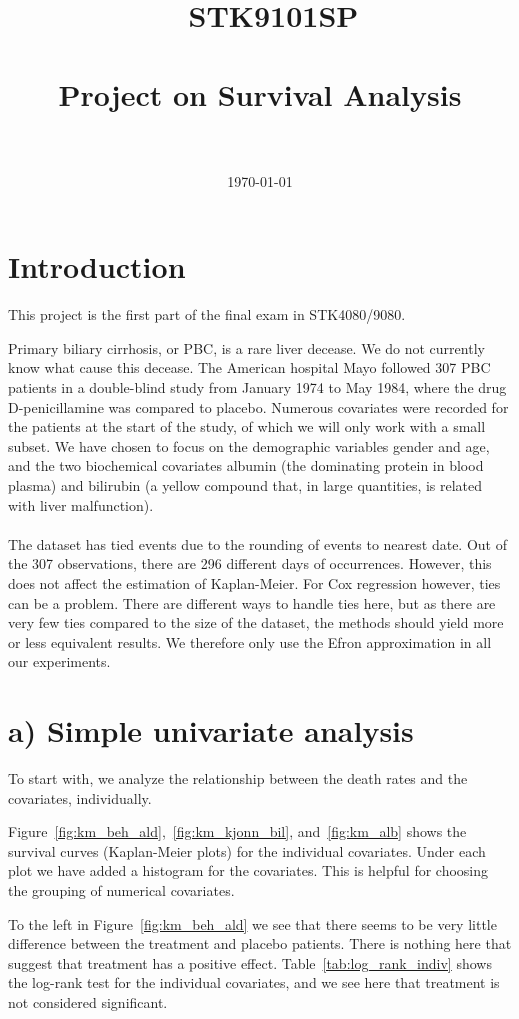 \documentclass[11pt,a4paper]{article}
\title{\
\normalfont \normalsize 
\textsc{STK9101SP} \\ [25pt] %
\horrule{0.5pt} \\[0.4cm] %
\huge Project on Survival Analysis \\ %
\horrule{2pt} \\[0.5cm] %
}
\author{\AuthorName} %
\date{\normalsize\today} %
\begin{document}
\maketitle
%
\section{Introduction}
This project is the first part of the final exam in STK4080/9080.

Primary biliary cirrhosis, or PBC, is a rare liver decease. We do not currently know what cause this decease.  
The American hospital Mayo followed 307 PBC patients in a double-blind study from January 1974 to May 1984, where the drug D-penicillamine was compared to placebo.
Numerous covariates were recorded for the patients at the start of the study, of which we will only work with a small subset.
We have chosen to focus on the demographic variables gender and age, and the two biochemical covariates albumin (the dominating protein in blood plasma) and bilirubin (a yellow compound that, in large quantities, is related with liver malfunction).
\\
\\
The dataset has tied events due to the rounding of events to nearest date. Out of the 307 observations, there are 296 different days of occurrences. However, this does not affect the estimation of Kaplan-Meier. 
For Cox regression however, ties can be a problem. There are different ways to handle ties here, but as there are very few ties compared to the size of the dataset, the methods should yield more or less equivalent results. We therefore only use the Efron approximation in all our experiments.


\section{a) Simple univariate analysis}

To start with, we analyze the relationship between the death rates and the covariates, individually.

Figure~\ref{fig:km_beh_ald},~\ref{fig:km_kjonn_bil}, and~\ref{fig:km_alb} shows the survival curves (Kaplan-Meier plots) for the individual covariates. 
Under each plot we have added a histogram for the covariates. This is helpful for choosing the grouping of numerical covariates.

To the left in Figure~\ref{fig:km_beh_ald} we see that there seems to be very little difference between the treatment and placebo patients. There is nothing here that suggest that treatment has a positive effect. Table~\ref{tab:log_rank_indiv} shows the log-rank test for the individual covariates, and we see here that treatment is not considered significant.
\end{document}
